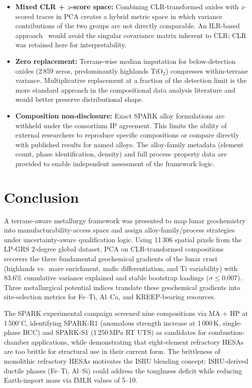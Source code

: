 \documentclass[11pt,a4paper]{article}
\begin{document}
\begin{itemize}[leftmargin=1.4em]
  \item \textbf{Mixed CLR + $z$-score space:} Combining CLR-transformed oxides with $z$-scored traces in PCA creates a hybrid metric space in which variance contributions of the two groups are not directly comparable. An ILR-based approach~\cite{Filzmoser2009} would avoid the singular covariance matrix inherent to CLR; CLR was retained here for interpretability.
  \item \textbf{Zero replacement:} Terrane-wise median imputation for below-detection oxides (2\,859 zeros, predominantly highlands TiO$_2$) compresses within-terrane variance. Multiplicative replacement at a fraction of the detection limit is the more standard approach in the compositional data analysis literature and would better preserve distributional shape.
  \item \textbf{Composition non-disclosure:} Exact SPARK alloy formulations are withheld under the consortium IP agreement. This limits the ability of external researchers to reproduce specific compositions or compare directly with published results for named alloys. The alloy-family metadata (element count, phase identification, density) and full process--property data are provided to enable independent assessment of the framework logic.
\end{itemize}

\section{Conclusion}

A terrane-aware metallurgy framework was presented to map lunar geochemistry into manufacturability-access space and assign alloy-family/process strategies under uncertainty-aware qualification logic. Using 11\,306 spatial pixels from the LP-GRS 2-degree global dataset, PCA on CLR-transformed compositions recovers the three fundamental geochemical gradients of the lunar crust (highlands vs.\ mare enrichment, mafic differentiation, and Ti variability) with 83.6\% cumulative variance explained and stable bootstrap loadings ($\sigma \leq 0.007$). Three metallurgical potential indices translate these geochemical gradients into site-selection metrics for Fe--Ti, Al--Ca, and KREEP-bearing resources.

The SPARK experimental campaign screened nine compositions via MA + HP at 1\,500$^\circ$C, identifying SPARK-R1 (anomalous strength increase at 1\,000\,K, single-phase BCC) and SPARK-S1 (1\,250\,MPa RT UTS) as candidates for combustion-chamber applications, while demonstrating that eight-element refractory HESAs are too brittle for structural use in their current form. The brittleness of monolithic refractory HESAs motivates the ISRU blending concept: ISRU-derived ductile phases (Fe--Ti, Al--Si) could address the toughness deficit while reducing Earth-import mass via IMLR values of 5--10.
\end{document}
